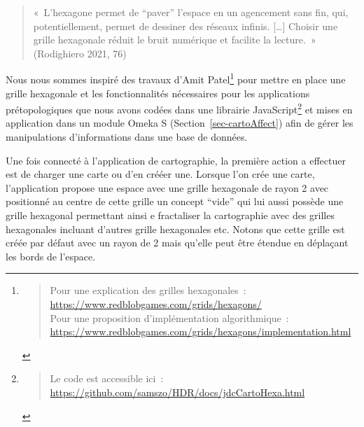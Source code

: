 \documentclass[
  letterpaper,
  DIV=11,
  numbers=noendperiod]{scrreprt}
\begin{document}
\begin{quote}
«~L'hexagone permet de ``paver'' l'espace en un agencement sans fin,
qui, potentiellement, permet de dessiner des réseaux infinis.
{[}\ldots{]} Choisir une grille hexagonale réduit le bruit numérique et
facilite la lecture.~» (Rodighiero 2021, 76)
\end{quote}

Nous nous sommes inspiré des travaux d'Amit Patel\footnote{\begin{quote}
  Pour une explication des grilles hexagonales~:
  \url{https://www.redblobgames.com/grids/hexagons/}\\
  Pour une proposition d'implémentation algorithmique~:
  \url{https://www.redblobgames.com/grids/hexagons/implementation.html}
  \end{quote}} pour mettre en place une grille hexagonale et les
fonctionnalités nécessaires pour les applications prétopologiques que
nous avons codées dans une librairie JavaScript\footnote{\begin{quote}
  Le code est accessible ici~:
  \url{https://github.com/samszo/HDR/docs/jdcCartoHexa.html}
  \end{quote}} et mises en application dans un module Omeka S
(Section~\ref{sec-cartoAffect}) afin de gérer les manipulations
d'informations dans une base de données.

Une fois connecté à l'application de cartographie, la première action a
effectuer est de charger une carte ou d'en crééer une. Lorsque l'on crée
une carte, l'application propose une espace avec une grille hexagonale
de rayon 2 avec positionné au centre de cette grille un concept ``vide''
qui lui aussi possède une grille hexagonal permettant ainsi e
fractaliser la cartographie avec des grilles hexagonales incluant
d'autres grille hexagonales etc. Notons que cette grille est créée par
défaut avec un rayon de 2 mais qu'elle peut être étendue en déplaçant
les bords de l'espace.
\end{document}
